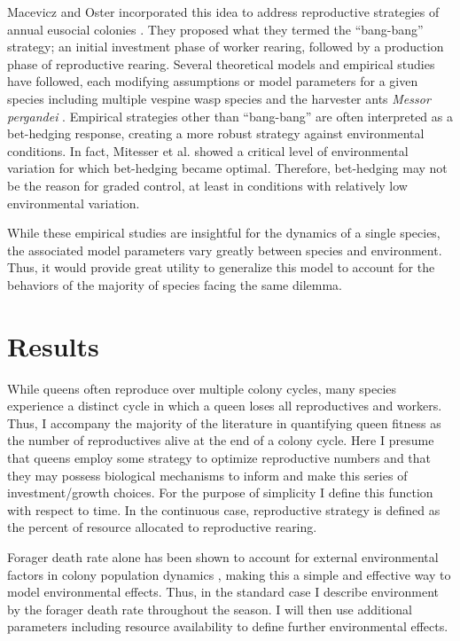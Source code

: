 \documentclass[12pt]{report}
\begin{document}
Macevicz and Oster incorporated this idea to address reproductive strategies of annual eusocial colonies \cite{macevicz1976modeling}. They proposed what they termed the “bang-bang” strategy; an initial investment phase of worker rearing, followed by a production phase of reproductive rearing. Several theoretical models \cite{mitesser2007optimal,mitesser2007adaptive} and empirical studies \cite{greene1984production,ode2002resource} have followed, each modifying assumptions or model parameters for a given species including multiple vespine wasp species \cite{greene1984production} and the harvester ants \textit{Messor pergandei} \cite{ode2002resource}. Empirical strategies other than “bang-bang” are often interpreted as a bet-hedging response, creating a more robust strategy against environmental conditions. In fact, Mitesser et al. \cite{mitesser2007adaptive} showed a critical level of environmental variation for which bet-hedging became optimal. Therefore, bet-hedging may not be the reason for graded control, at least in conditions with relatively low environmental variation. 

While these empirical studies are insightful for the dynamics of a single species, the associated model parameters vary greatly between species and environment. Thus, it would provide great utility to generalize this model to account for the behaviors of the majority of species facing the same dilemma. 


\chapter*{Results}
While queens often reproduce over multiple colony cycles, many species experience a distinct cycle in which a queen loses all reproductives and workers. Thus, I accompany the majority of the literature in quantifying queen fitness as the number of reproductives alive at the end of a colony cycle. Here I presume that queens employ some strategy to optimize reproductive numbers and that they may possess biological mechanisms to inform and make this series of investment/growth choices. For the purpose of simplicity I define this function with respect to time. In the continuous case, reproductive strategy is defined as the percent of resource allocated to reproductive rearing.

Forager death rate alone has been shown to account for external environmental factors in colony population dynamics \cite{khoury2011quantitative}, making this a simple and effective way to model environmental effects. Thus, in the standard case I describe environment by the forager death rate throughout the season. I will then use additional parameters including resource availability to define further environmental effects. 
\end{document}
